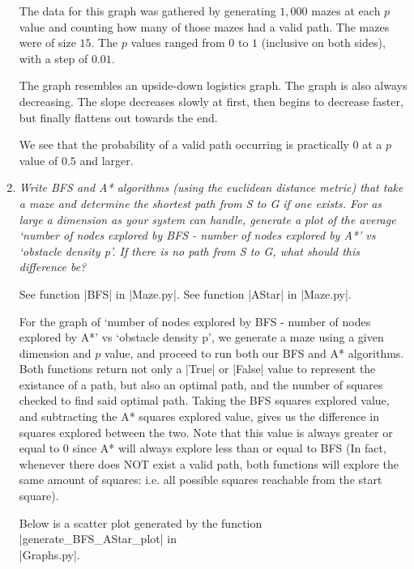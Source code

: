 \documentclass[12pt, twoside]{article}
\begin{document}
\begin{enumerate}
        The data for this graph was gathered by generating $1,000$ mazes at each $p$ value and counting how many of those mazes had a valid path. The mazes were of size $15$. The $p$ values ranged from $0$ to $1$ (inclusive on both sides), with a step of $0.01$. 

        The graph resembles an upside-down logistics graph. The graph is also always decreasing. The slope decreases slowly at first, then begins to decrease faster, but finally flattens out towards the end. 
        
        We see that the probability of a valid path occurring is practically $0$ at a $p$ value of $0.5$ and larger.

        \vfill

    \item
        \textit{Write BFS and A* algorithms (using the euclidean distance metric) that take a maze and determine  the  shortest  path  from S to G if  one  exists.  For  as  large  a  dimension  as  your  system  can handle, generate a plot of the average ‘number of nodes explored by BFS - number of nodes explored by A*’ vs ‘obstacle density p’.  If there is no path from S to G, what should this difference be?}

        \vspace{4mm}
        See function \cverb|BFS| in \cverb|Maze.py|. See function \cverb|AStar| in \cverb|Maze.py|.

        \vspace{4mm}
        For the graph of `number of nodes explored by BFS - number of nodes explored by A*' vs `obstacle density p', we generate a maze using a given dimension and $p$ value, and proceed to run both our BFS and A* algorithms. Both functions return not only a \cverb|True| or \cverb|False| value to represent the existance of a path, but also an optimal path, and the number of squares checked to find said optimal path. Taking the BFS squares explored value, and subtracting the A* squares explored value, gives us the difference in squares explored between the two. Note that this value is always greater or equal to 0 since A* will always explore less than or equal to BFS (In fact, whenever there does NOT exist a valid path, both functions will explore the same amount of squares: i.e. all possible squares reachable from the start square).  

        Below is a scatter plot generated by the function \cverb|generate_BFS_AStar_plot| in \\ \cverb|Graphs.py|.


\end{enumerate}
\end{document}
